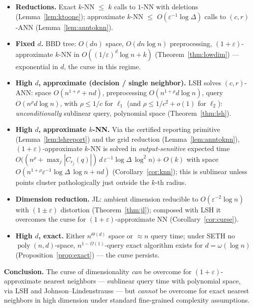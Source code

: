 \documentclass{amsart}
\DeclareMathOperator{\poly}{poly}
\newcommand{\eps}{\varepsilon}
\begin{document}
\begin{itemize}
\item \textbf{Reductions.} Exact $k$-NN $\le$ $k$ calls to $1$-NN with deletions
(Lemma~\ref{lem:ktoone}); approximate $k$-NN $\le$ $O(\eps^{-1}\log\Delta)$ calls to
$(c,r)$-ANN (Lemma~\ref{lem:anntoknn}).
\item \textbf{Fixed $d$.} BBD tree: $O(dn)$ space, $O(dn\log n)$ preprocessing,
$(1+\eps)$-approximate $k$-NN in $O((1/\eps)^d\log n+k)$ (Theorem~\ref{thm:lowdim}) —
exponential in $d$, the curse in this regime.
\item \textbf{High $d$, approximate (decision / single neighbor).} LSH solves
$(c,r)$-ANN: space $O(n^{1+\rho}+nd)$, preprocessing $O(n^{1+\rho}d\log n)$, query
$O(n^{\rho}d\log n)$, with $\rho\le 1/c$ for $\ell_1$ (and $\rho\le 1/c^2+o(1)$ for
$\ell_2$): \emph{unconditionally} sublinear query, polynomial space
(Theorem~\ref{thm:lsh}).
\item \textbf{High $d$, approximate $k$-NN.} Via the certified reporting primitive
(Lemma~\ref{lem:lshreport}) and the grid reduction (Lemma~\ref{lem:anntoknn}),
$(1+\eps)$-approximate $k$-NN is solved in \emph{output-sensitive} expected time
$O\big((n^{\rho}+\max_j|C_{r_j}(q)|)\,d\,\eps^{-1}\log\Delta\,\log^2 n\big)+O(k)$ with
space $O(n^{1+\rho}\eps^{-1}\log\Delta\,\log n+nd)$ (Corollary~\ref{cor:knn}); this is
sublinear unless points cluster pathologically just outside the $k$-th radius.
\item \textbf{Dimension reduction.} JL: ambient dimension reducible to
$O(\eps^{-2}\log n)$ with $(1\pm\eps)$ distortion (Theorem~\ref{thm:jl}); composed
with LSH it overcomes the curse for $(1+\eps)$-approximate NN
(Corollary~\ref{cor:curse}).
\item \textbf{High $d$, exact.} Either $n^{\Theta(d)}$ space or $\approx n$ query time;
under SETH no $\poly(n,d)$-space, $n^{1-\Omega(1)}$-query exact algorithm exists for
$d=\omega(\log n)$ (Proposition~\ref{prop:exact}) — the curse persists.
\end{itemize}

\noindent\textbf{Conclusion.} The curse of dimensionality \emph{can} be overcome for
$(1+\eps)$-approximate nearest neighbors — sublinear query time with polynomial space,
via LSH and Johnson--Lindenstrauss — but \emph{cannot} be overcome for exact nearest
neighbors in high dimension under standard fine-grained complexity assumptions.
\end{document}
